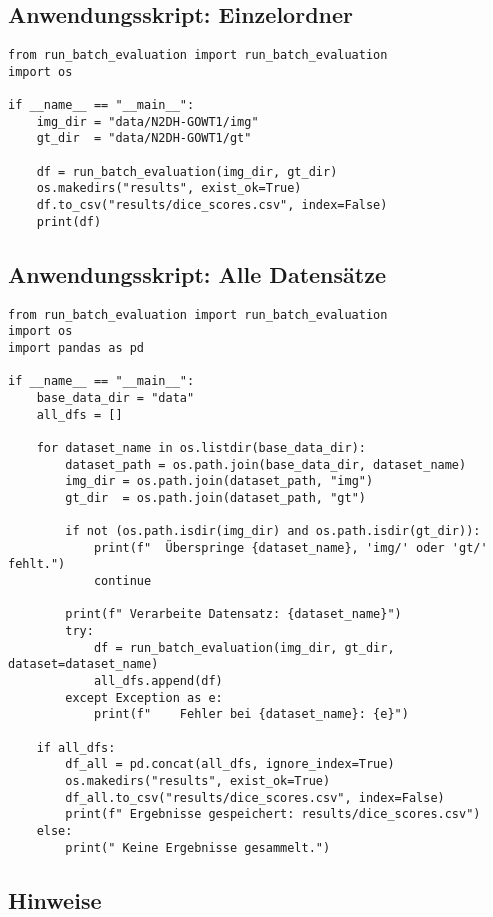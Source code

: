 \documentclass[a4paper,12pt]{article}
\begin{document}
\subsection*{ Anwendungsskript: Einzelordner}

\begin{verbatim}
from run_batch_evaluation import run_batch_evaluation
import os

if __name__ == "__main__":
    img_dir = "data/N2DH-GOWT1/img"
    gt_dir  = "data/N2DH-GOWT1/gt"

    df = run_batch_evaluation(img_dir, gt_dir)
    os.makedirs("results", exist_ok=True)
    df.to_csv("results/dice_scores.csv", index=False)
    print(df)
\end{verbatim}

\subsection*{ Anwendungsskript: Alle Datensätze}

\begin{verbatim}
from run_batch_evaluation import run_batch_evaluation
import os
import pandas as pd

if __name__ == "__main__":
    base_data_dir = "data"
    all_dfs = []

    for dataset_name in os.listdir(base_data_dir):
        dataset_path = os.path.join(base_data_dir, dataset_name)
        img_dir = os.path.join(dataset_path, "img")
        gt_dir  = os.path.join(dataset_path, "gt")

        if not (os.path.isdir(img_dir) and os.path.isdir(gt_dir)):
            print(f"  Überspringe {dataset_name}, 'img/' oder 'gt/' fehlt.")
            continue

        print(f" Verarbeite Datensatz: {dataset_name}")
        try:
            df = run_batch_evaluation(img_dir, gt_dir, dataset=dataset_name)
            all_dfs.append(df)
        except Exception as e:
            print(f"    Fehler bei {dataset_name}: {e}")

    if all_dfs:
        df_all = pd.concat(all_dfs, ignore_index=True)
        os.makedirs("results", exist_ok=True)
        df_all.to_csv("results/dice_scores.csv", index=False)
        print(f" Ergebnisse gespeichert: results/dice_scores.csv")
    else:
        print(" Keine Ergebnisse gesammelt.")
\end{verbatim}

\subsection*{ Hinweise}
\end{document}

